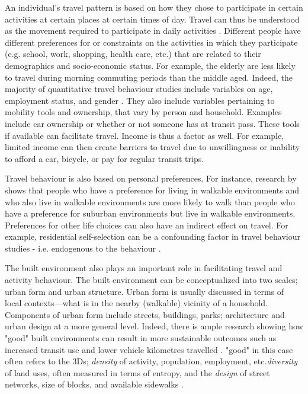 An individual's travel pattern is based on how they chose to participate in certain activities at certain places at certain times of day. Travel can thus be understood as the movement required to participate in daily activities \cite{hanson_determinants_1982}. Different people have different preferences for or constraints on the activities in which they participate (e.g. school, work, shopping, health care, etc.) that are related to their demographics and socio-economic status. For example, the elderly are less likely to travel during morning commuting periods than the middle aged. Indeed, the majority of quantitative travel behaviour studies include variables on age, employment status, and gender \cite{hanson_determinants_1982}. They also include variables pertaining to mobility tools and ownership, that vary by person and household. Examples include car ownership or whether or not someone has at transit pass. These tools if available can facilitate travel. Income is thus a factor as well. For example, limited income can then create barriers to travel due to unwillingness or inability to afford a car, bicycle, or pay for regular transit trips.

Travel behaviour is also based on personal preferences. For instance, research by \cite{schwanen_what_2005} shows that people who have a preference for living in walkable environments and who also live in walkable environments are more likely to walk than people who have a preference for suburban environments but live in walkable environments. Preferences for other life choices can also have an indirect effect on travel. For example, residential self-selection can be a confounding factor in travel behaviour studies - i.e. endogenous to the behaviour \cite{cao_how_2016}.

The built environment also plays an important role in facilitating travel and activity behaviour. The built environment can be conceptualized into two scales; urban form and urban structure. Urban form is usually discussed in terms of local contexts---what is in the nearby (walkable) vicinity of a household. Components of urban form include streets, buildings, parks; architecture and urban design at a more general level. Indeed, there is ample research showing how "good" built environments can result in more sustainable outcomes such as increased transit use and lower vehicle kilometres travelled \cite{ewing_travel_2010,ewing_compactness_2015}. "good" in this case often refers to the 3Ds; \textit{density} of activity, population, employment, etc.\textit{diversity} of land uses, often measured in terms of entropy, and the \textit{design} of street networks, size of blocks, and available sidewalks \cite{cervero_travel_1997}.


